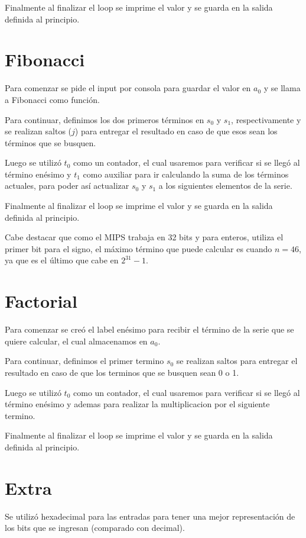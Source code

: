 \documentclass[11pt,letterpaper]{article}
\begin{document}
Finalmente al finalizar el loop se imprime el valor y se guarda en la salida definida al principio.


\section{Fibonacci}
Para comenzar se pide el input por consola para guardar el valor en $a_0$ y se llama a Fibonacci como función.

Para continuar, definimos los dos primeros términos en $s_0$ y $s_1$, respectivamente y se realizan saltos ($j$) para entregar el resultado en caso de que esos sean los términos que se busquen.

Luego se utilizó $t_0$ como un contador, el cual usaremos para verificar si se llegó al término enésimo y $t_1$ como auxiliar para ir calculando la suma de los términos actuales, para poder así actualizar $s_0$ y $s_1$ a los siguientes elementos de la serie.

Finalmente al finalizar el loop se imprime el valor y se guarda en la salida definida al principio.

Cabe destacar que como el MIPS trabaja en 32 bits y para enteros, utiliza el primer bit para el signo, el máximo término que puede calcular es cuando $n=46$, ya que es el último que cabe en $2^{31}-1$.

\section{Factorial}
Para comenzar se creó el label enésimo para recibir el término de la serie que se quiere calcular, el cual almacenamos en $a_0$. 

Para continuar, definimos el primer termino  $s_0$ se realizan saltos para entregar el resultado en caso de que los terminos que se busquen sean 0 o 1.

Luego se utilizó $t_0$ como un contador, el cual usaremos para verificar si se llegó al término enésimo y ademas para realizar la multiplicacion por el siguiente termino.

Finalmente al finalizar el loop se imprime el valor y se guarda en la salida definida al principio.



\section{Extra}
Se utilizó hexadecimal para las entradas para tener una mejor representación de los bits que se ingresan (comparado con decimal). 
\end{document}
